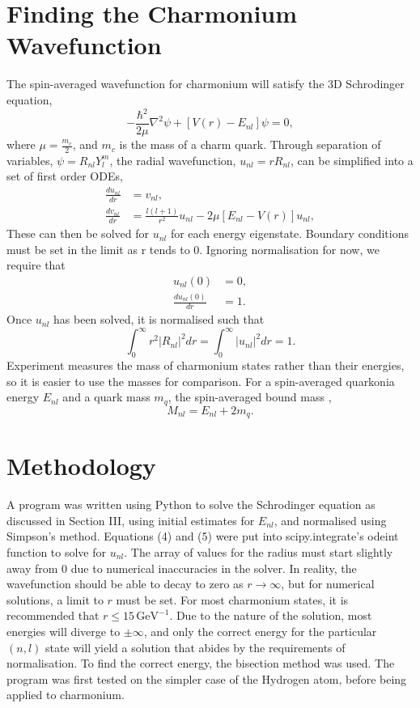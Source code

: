 \documentclass[10pt, twocolumn]{article}
\begin{document}
\section{Finding the Charmonium Wavefunction}
The spin-averaged wavefunction for charmonium will satisfy the 3D Schrodinger equation,
\begin{equation}
    -\frac{\hbar^2}{2\mu}\nabla^2\psi + \left[V(r) - E_{nl}\right]\psi = 0,
\end{equation}
where $\mu = \frac{m_c}{2}$, and $m_c$ is the mass of a charm quark.
Through separation of variables, $\psi = R_{nl}Y^m_l$, the radial wavefunction, $u_{nl} = rR_{nl}$, can be simplified into a set of first order ODEs, 
\begin{align}
    \frac{du_{nl}}{dr} &= v_{nl}, \\
    \frac{dv_{nl}}{dr} &= \frac{l(l+1)}{r^2}u_{nl} - 2\mu\left[E_{nl} - V(r)\right]u_{nl},
\end{align}
These can then be solved for $u_{nl}$ for each energy eigenstate.
Boundary conditions must be set in the limit as r tends to 0.
Ignoring normalisation for now, we require that
\begin{align}
    u_{nl}(0) &= 0, \\
    \frac{du_{nl}(0)}{dr} &= 1.
\end{align}
Once $u_{nl}$ has been solved, it is normalised such that
\begin{equation}
    \int_0^\infty r^2|R_{nl}|^2dr = \int_0^\infty |u_{nl}|^2dr = 1.
\end{equation}
Experiment measures the mass of charmonium states rather than their energies, so it is easier to use the masses for comparison.
For a spin-averaged quarkonia energy $E_{nl}$ and a quark mass $m_q$, the spin-averaged bound mass \cite{1},
\begin{equation}
    M_{nl} = E_{nl} + 2m_q.
\end{equation}

\section{Methodology}
A program was written using Python to solve the Schrodinger equation as discussed in Section \RN{3}, using initial estimates for $E_{nl}$, and normalised using Simpson's method.
Equations (4) and (5) were put into scipy.integrate's odeint function to solve for $u_{nl}$. 
The array of values for the radius must start slightly away from 0 due to numerical inaccuracies in the solver.
In reality, the wavefunction should be able to decay to zero as $r\to\infty$, but for numerical solutions, a limit to $r$ must be set. 
For most charmonium states, it is recommended that $r \leq 15\,\text{GeV}^{-1}$.
Due to the nature of the solution, most energies will diverge to $\pm\infty$, and only the correct energy for the particular $(n,l)$ state will yield a solution that abides by the requirements of normalisation.
To find the correct energy, the bisection method was used.
The program was first tested on the simpler case of the Hydrogen atom, before being applied to charmonium.
\end{document}
